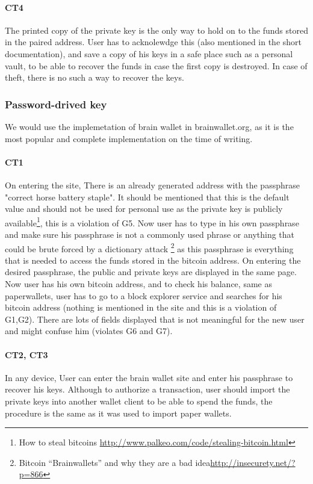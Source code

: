 \paragraph{CT4} The printed copy of the private key is the only way to hold on to the funds stored in the paired address. User has to acknolewdge this (also mentioned in the short documentation), and save a copy of his keys in a safe place such as a personal vault, to be able to recover the funds in case the first copy is destroyed. In case of theft, there is no such a way to recover the keys.


\subsubsection{Password-drived key} We would use the implemetation of brain wallet in brainwallet.org, as it is the most popular and complete implementation on the time of writing.
\paragraph{CT1} On entering the site, There is an already generated address with the passphrase "correct horse battery staple". It should be mentioned that this is the default value and should not be used for personal use as the private key is publicly available\footnote{How to steal bitcoins \url{http://www.palkeo.com/code/stealing-bitcoin.html}}, this is a violation of G5. Now user has to type in his own passphrase and make sure his passphrase is not a commonly used phrase or anything that could be brute forced by a dictionary attack \footnote{Bitcoin “Brainwallets” and why they are a bad idea\url{http://insecurety.net/?p=866}} as this passphrase is everything that is needed to access the funds stored in the bitcoin address. On entering the desired passphrase, the public and private keys are displayed in the same page. Now user has his own bitcoin address, and to check his balance, same as paperwallets, user has to go to a block explorer service and searches for his bitcoin address (nothing is mentioned in the site and this is a violation of G1,G2). There are lots of fields displayed that is not meaningful for the new user and might confuse him (violates G6 and G7).

\paragraph{CT2, CT3} In any device, User can enter the brain wallet site and enter his passphrase to recover his keys. Although to authorize a transaction, user should import the private keys into another wallet client to be able to spend the funds, the procedure is the same as it was used to import paper wallets.

